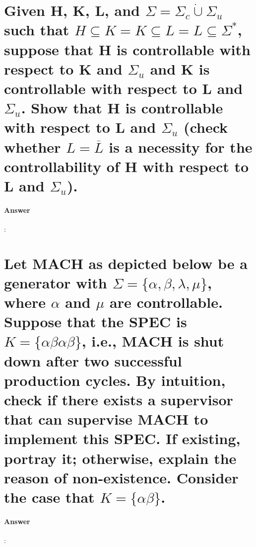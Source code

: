 \documentclass{article}
\begin{document}
\section{Given H, K, L, and $\Sigma = \Sigma_c \dot{\cup} \Sigma_u$ such that $H \subseteq K = K \subseteq L = L \subseteq \Sigma^*$, suppose that H is controllable with respect to K and $\Sigma_u$ and K is controllable with respect to L and $\Sigma_u$. Show that H is controllable with respect to L and $\Sigma_u$ (check whether $L = \overline{L}$ is a necessity for the controllability of H with respect to L and $\Sigma_u$).}

\paragraph{Answer}:

\section{Let MACH as depicted below be a generator with $\Sigma = \{\alpha , \beta , \lambda , \mu \}$, where $\alpha$ and $\mu$ are controllable. Suppose that the SPEC is $K = \{\alpha\beta\alpha\beta\}$, i.e., MACH is shut down after two successful production cycles. By intuition, check if there exists a supervisor that can supervise MACH to implement this SPEC. If existing, portray it; otherwise, explain the reason of non-existence. Consider the case that $K = \{\alpha\beta\}$.}

\paragraph{Answer}:
\end{document}
